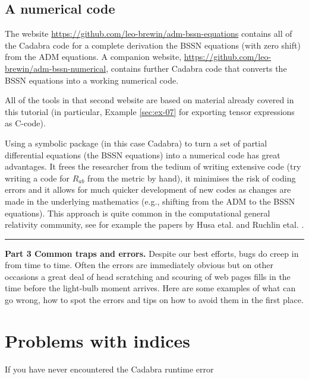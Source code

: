 \documentclass[a4paper,12pt]{article}
\numberwithin{equation}{section}%
\begin{document}
\subsection{A numerical code}

The website \url{https://github.com/leo-brewin/adm-bssn-equations} contains all of the
Cadabra code for a complete derivation the BSSN equations (with zero shift) from the ADM
equations. A companion website, \url{https://github.com/leo-brewin/adm-bssn-numerical},
contains further Cadabra code that converts the BSSN equations into a working numerical code.

All of the tools in that second website are based on material already covered in this
tutorial (in particular, Example \ref{sec:ex-07} for exporting tensor expressions as C-code).

Using a symbolic package (in this case Cadabra) to turn a set of partial differential
equations (the BSSN equations) into a numerical code has great advantages. It frees the
researcher from the tedium of writing extensive code (try writing a code for $R_{ab}$ from
the metric by hand), it minimises the risk of coding errors and it allows for much quicker
development of new codes as changes are made in the underlying mathematics (e.g., shifting
from the ADM to the BSSN equations). This approach is quite common in the computational general
relativity community, see for example the papers by Husa etal. \cite{husa:2006-01} and
Ruchlin etal. \cite{ruchlin:2018-01}.

\clearpage

\hrule height 0pt
\vskip 4cm
{\Huge\bf Part 3 Common traps and errors.}
\vskip 2cm
Despite our best efforts, bugs do creep in from time to time. Often the errors are
immediately obvious but on other occasions a great deal of head scratching and scouring of
web pages fills in the time before the light-bulb moment arrives. Here are some examples of
what can go wrong, how to spot the errors and tips on how to avoid them in the first place.

\clearpage

\section*{Problems with indices}
If you have never encountered the Cadabra runtime error
\end{document}
